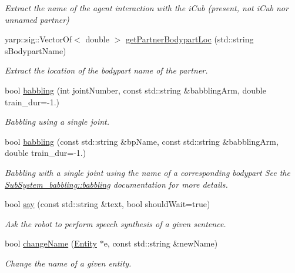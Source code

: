 \begin{DoxyCompactItemize}
\begin{DoxyCompactList}\small\item\em Extract the name of the agent interaction with the i\+Cub (present, not i\+Cub nor \textquotesingle{}unnamed\textquotesingle{} partner) \end{DoxyCompactList}\item 
yarp\+::sig\+::\+Vector\+Of$<$ double $>$ \hyperlink{group__icubclient__clients_ae40ff3f75d4c2fa6d4e2d0c55ee568ca}{get\+Partner\+Bodypart\+Loc} (std\+::string s\+Bodypart\+Name)
\begin{DoxyCompactList}\small\item\em Extract the location of the bodypart name of the partner. \end{DoxyCompactList}\item 
bool \hyperlink{group__icubclient__clients_a2c1758c19e1fcb1fb322499990cc2646}{babbling} (int joint\+Number, const std\+::string \&babbling\+Arm, double train\+\_\+dur=-\/1.)
\begin{DoxyCompactList}\small\item\em Babbling using a single joint. \end{DoxyCompactList}\item 
bool \hyperlink{group__icubclient__clients_a078c593ad81fb05676b1eb6d68c6c655}{babbling} (const std\+::string \&bp\+Name, const std\+::string \&babbling\+Arm, double train\+\_\+dur=-\/1.)
\begin{DoxyCompactList}\small\item\em Babbling with a single joint using the name of a corresponding bodypart See the \hyperlink{group__icubclient__subsystems_a9baa0d296d355f5e2c83ec972b17cdad}{Sub\+System\+\_\+babbling\+::babbling} documentation for more details. \end{DoxyCompactList}\item 
bool \hyperlink{group__icubclient__clients_aee94220297bc4131cd0236838ec8027d}{say} (const std\+::string \&text, bool should\+Wait=true)
\begin{DoxyCompactList}\small\item\em Ask the robot to perform speech synthesis of a given sentence. \end{DoxyCompactList}\item 
bool \hyperlink{group__icubclient__clients_a860fb1399bafb125c3955110dc17a42e}{change\+Name} (\hyperlink{group__icubclient__representations_classicubclient_1_1Entity}{Entity} $\ast$e, const std\+::string \&new\+Name)
\begin{DoxyCompactList}\small\item\em Change the name of a given entity. \end{DoxyCompactList}\item 

\end{DoxyCompactItemize}
